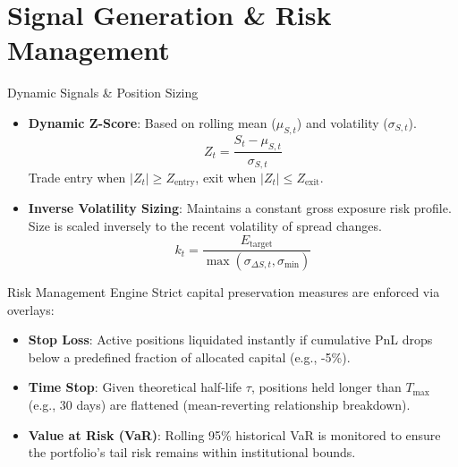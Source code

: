 \documentclass[11pt,aspectratio=169]{beamer}
\begin{document}
\section{Signal Generation \& Risk Management}
\begin{frame}{Dynamic Signals \& Position Sizing}
    \begin{itemize}
        \item \textbf{Dynamic Z-Score}: Based on rolling mean ($\mu_{S,t}$) and volatility ($\sigma_{S,t}$).
        \begin{equation*}
            Z_t = \frac{S_t - \mu_{S,t}}{\sigma_{S,t}}
        \end{equation*}
        Trade entry when $|Z_t| \geq Z_{\text{entry}}$, exit when $|Z_t| \leq Z_{\text{exit}}$.
        \vspace{0.3cm}
        \item \textbf{Inverse Volatility Sizing}:
        Maintains a constant gross exposure risk profile. Size is scaled inversely to the recent volatility of spread changes.
        \begin{equation*}
            k_t = \frac{E_{\text{target}}}{\max(\sigma_{\Delta S, t}, \sigma_{\text{min}})}
        \end{equation*}
    \end{itemize}
\end{frame}

\begin{frame}{Risk Management Engine}
    Strict capital preservation measures are enforced via overlays:
    \vspace{0.3cm}
    \begin{itemize}
        \item \textbf{Stop Loss}: Active positions liquidated instantly if cumulative PnL drops below a predefined fraction of allocated capital (e.g., -5\%).
        \vspace{0.2cm}
        \item \textbf{Time Stop}: Given theoretical half-life $\tau$, positions held longer than $T_{\text{max}}$ (e.g., 30 days) are flattened (mean-reverting relationship breakdown).
        \vspace{0.2cm}
        \item \textbf{Value at Risk (VaR)}: Rolling 95\% historical VaR is monitored to ensure the portfolio's tail risk remains within institutional bounds.
    \end{itemize}
\end{frame}
\end{document}
